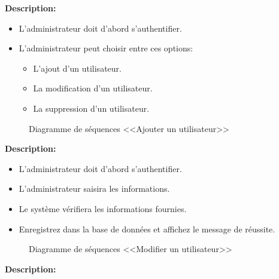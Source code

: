 \documentclass[12pt]{report}
\begin{document}
\vspace{0.3in}

\textbf{Description:}

\begin{itemize}
    \item L'administrateur doit d'abord s'authentifier.
    \item L'administrateur peut choisir entre ces options:
    \begin{itemize}
        \item L'ajout d'un utilisateur.
        \item La modification d'un utilisateur.
        \item La suppression d'un utilisateur.
    \end{itemize}
\end{itemize}

\newpage

\begin{figure}[h]
\centering
    \caption{Diagramme de séquences <<Ajouter un utilisateur>>}
\end{figure}

\vspace{0.3in}

\textbf{Description:}

\begin{itemize}
    \item L'administrateur doit d'abord s'authentifier.
    \item L'administrateur saisira les informations.
    \item Le système vérifiera les informations fournies.
    \item Enregistrez dans la base de données et affichez le message de réussite.
\end{itemize}

\newpage

\begin{figure}[h]
\centering
    \caption{Diagramme de séquences <<Modifier un utilisateur>>}
\end{figure}

\vspace{0.3in}

\textbf{Description:}
\end{document}
